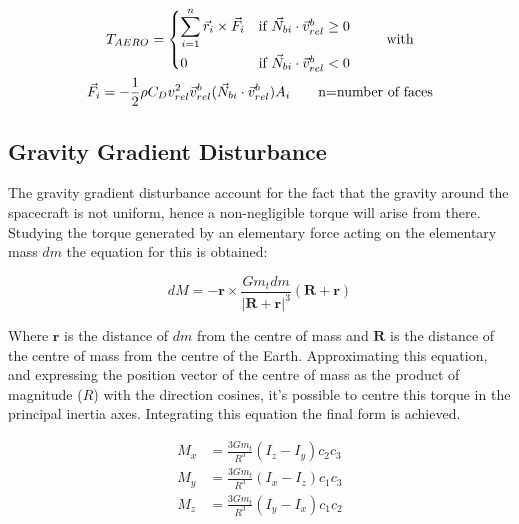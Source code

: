 \begin{equation}
	\begin{gathered}
		T_{AERO} =
		\begin{dcases*}
			\sum_{i=1}^{n} \vec{r}_i \times \vec{F}_i & if $\vec{N}_{bi} \cdot \vec{v}^{b}_{rel} \geq 0$ \\
			0 & if $\vec{N}_{bi} \cdot \vec{v}^{b}_{rel} < 0$
		\end{dcases*}
		\qquad \text{with} \\
		\vec{F}_i = -\frac{1}{2} \rho C_D v_{rel}^2 \vec{v}_{rel}^{b} (\vec{N}_{bi} \cdot \vec{v}_{rel}^{b}) A_i \qquad \text{n=number of faces}
	\end{gathered}
\end{equation}

\subsection{Gravity Gradient Disturbance}
\label{subsec:dist_GG}

The gravity gradient disturbance account for the fact that the gravity around the spacecraft is not uniform, hence a non-negligible torque 
will arise from there.
Studying the torque generated by an elementary force acting on the elementary mass \( dm \) the equation for this is obtained:

\begin{equation}
	dM = -\mathbf{r} \times \frac{Gm_t dm}{|\mathbf{R} + \mathbf{r}|^3} (\mathbf{R} + \mathbf{r})
\end{equation}

Where \( \mathbf{r} \) is the distance of \( dm \) from the centre of mass and \( \mathbf{R} \) is the distance of the centre of mass from the centre of the Earth. 
Approximating this equation, and expressing the position vector of the centre of mass as the product of magnitude (\( R \)) with the direction cosines, 
it’s possible to centre this torque in the principal inertia axes. Integrating this equation the final form is achieved.

\begin{equation}
	\begin{aligned}
		M_x &= \frac{3Gm_t}{R^3} (I_z - I_y)c_2c_3 \\
		M_y &= \frac{3Gm_t}{R^3} (I_x - I_z)c_1c_3 \\
		M_z &= \frac{3Gm_t}{R^3} (I_y - I_x)c_1c_2
	\end{aligned}
\end{equation}


